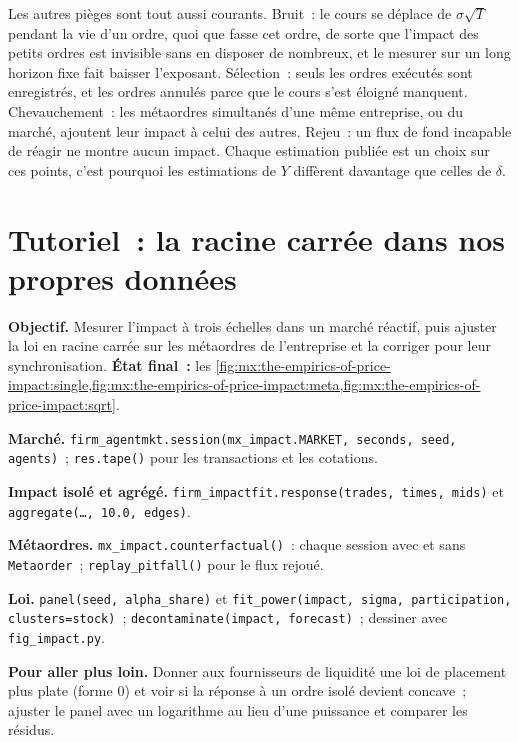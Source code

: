 Les autres pièges sont tout aussi courants. Bruit~: le cours se déplace de $\sigma\sqrt T$ pendant la vie d'un ordre, quoi que fasse cet ordre, de sorte que l'impact des petits ordres est
invisible sans en disposer de nombreux, et le mesurer sur un long horizon fixe fait baisser l'exposant. Sélection~: seuls les ordres exécutés sont enregistrés, et les ordres
annulés parce que le cours s'est éloigné manquent. Chevauchement~: les métaordres simultanés d'une même entreprise, ou du marché, ajoutent leur impact à
celui des autres. Rejeu~: un flux de fond incapable de réagir ne montre aucun impact. Chaque estimation publiée est un choix sur ces points, c'est pourquoi
les estimations de $Y$ diffèrent davantage que celles de $\delta$.

\section{Tutoriel~: la racine carrée dans nos propres données}\label{tut:mx:the-empirics-of-price-impact:tut}

\begin{tutorial}
\textbf{Objectif.} Mesurer l'impact à trois échelles dans un marché réactif, puis ajuster la loi en racine carrée sur les métaordres de l'entreprise et la corriger pour leur synchronisation.
\textbf{État final~:} les \cref{fig:mx:the-empirics-of-price-impact:single,fig:mx:the-empirics-of-price-impact:meta,fig:mx:the-empirics-of-price-impact:sqrt}.
\begin{tutsteps}
\item \textbf{Marché.} \texttt{firm\_agentmkt.session(mx\_impact.MARKET, seconds, seed, agents)}~; \texttt{res.tape()} pour les transactions et les cotations.
\item \textbf{Impact isolé et agrégé.} \texttt{firm\_impactfit.response(trades, times, mids)} et \texttt{aggregate(\dots, 10.0, edges)}.
\item \textbf{Métaordres.} \texttt{mx\_impact.counterfactual()}~: chaque session avec et sans \texttt{Metaorder}~; \texttt{replay\_pitfall()} pour le
flux rejoué.
\item \textbf{Loi.} \texttt{panel(seed, alpha\_share)} et \texttt{fit\_power(impact, sigma, participation, clusters=stock)}~;
\texttt{decontaminate(impact, forecast)}~; dessiner avec \texttt{fig\_impact.py}.
\end{tutsteps}
\textbf{Pour aller plus loin.} Donner aux fournisseurs de liquidité une loi de placement plus plate (forme 0) et voir si la réponse à un ordre isolé devient concave~; ajuster le
panel avec un logarithme au lieu d'une puissance et comparer les résidus.
\end{tutorial}

